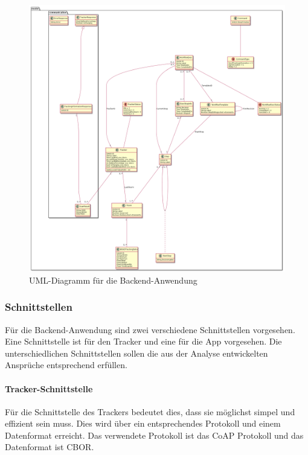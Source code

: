 \begin{figure}[h!tbp]
	\includegraphics[width=\textwidth]{images/uml.png}
	\centering
	\caption{UML-Diagramm für die Backend-Anwendung}
	\label{fig:uml}
\end{figure}

\FloatBarrier

\subsubsection{Schnittstellen}

Für die Backend-Anwendung sind zwei verschiedene Schnittstellen vorgesehen.
Eine Schnittstelle ist für den Tracker und eine für die App vorgesehen.
Die unterschiedlichen Schnittstellen sollen die aus der Analyse entwickelten Ansprüche entsprechend erfüllen.

\paragraph{Tracker-Schnittstelle} \label{par:tracker-schnittstelle}
Für die Schnittstelle des Trackers bedeutet dies, dass sie möglichst simpel und effizient sein muss.
Dies wird über ein entsprechendes Protokoll und einem Datenformat erreicht.
Das verwendete Protokoll ist das \acrfull{CoAP} Protokoll und das Datenformat ist \acrfull{CBOR}.

